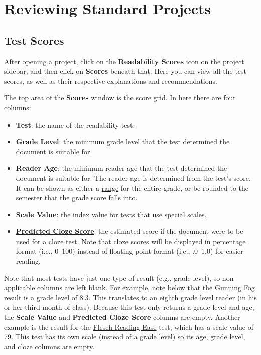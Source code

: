 \documentclass[
]{book}
\providecommand{\tightlist}{%
  \setlength{\itemsep}{0pt}\setlength{\parskip}{0pt}}
\theoremstyle{definition}
\theoremstyle{definition}
\theoremstyle{definition}
\theoremstyle{definition}
\theoremstyle{remark}
\begin{document}
\hypertarget{reviewing-standard-projects}{%
\chapter{Reviewing Standard Projects}\label{reviewing-standard-projects}}

\hypertarget{reviewing-test-scores}{%
\section{Test Scores}\label{reviewing-test-scores}}

After opening a project, click on the \textbf{Readability Scores} icon on the project sidebar, and then click on \textbf{Scores} beneath that. Here you can view all the test scores, as well as their respective explanations and recommendations.

The top area of the \textbf{Scores} window is the score grid. In here there are four columns:

\begin{itemize}
\tightlist
\item
  \textbf{Test}: the name of the readability test.
\item
  \textbf{Grade Level}: the minimum grade level that the test determined the document is suitable for.
\item
  \textbf{Reader Age}: the minimum reader age that the test determined the document is suitable for. The reader age is determined from the test's score. It can be shown as either a \protect\hyperlink{reading-age}{range} for the entire grade, or be rounded to the semester that the grade score falls into.
\item
  \textbf{Scale Value}: the index value for tests that use special scales.
\item
  \protect\hyperlink{cloze}{\textbf{Predicted Cloze Score}}: the estimated score if the document were to be used for a cloze test. Note that cloze scores will be displayed in percentage format (i.e., 0--100) instead of floating-point format (i.e., .0--1.0) for easier reading.
\end{itemize}

Note that most tests have just one type of result (e.g., grade level), so non-applicable columns are left blank. For example, note below that the \protect\hyperlink{gunning-fog-test}{Gunning Fog} result is a grade level of 8.3. This translates to an eighth grade level reader (in his or her third month of class). Because this test only returns a grade level and age, the \textbf{Scale Value} and \textbf{Predicted Cloze Score} columns are empty. Another example is the result for the \protect\hyperlink{flesch-test}{Flesch Reading Ease} test, which has a scale value of 79. This test has its own scale (instead of a grade level) so its age, grade level, and cloze columns are empty.
\end{document}

